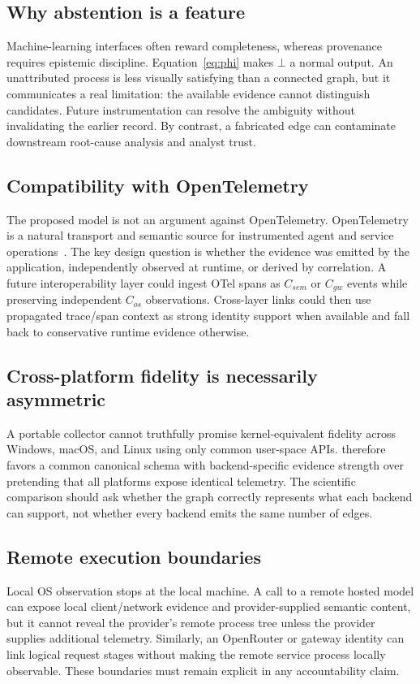 \subsection{Why abstention is a feature}
Machine-learning interfaces often reward completeness, whereas provenance requires epistemic discipline. Equation~\ref{eq:phi} makes $\bot$ a normal output. An unattributed process is less visually satisfying than a connected graph, but it communicates a real limitation: the available evidence cannot distinguish candidates. Future instrumentation can resolve the ambiguity without invalidating the earlier record. By contrast, a fabricated edge can contaminate downstream root-cause analysis and analyst trust.

\subsection{Compatibility with OpenTelemetry}
The proposed model is not an argument against OpenTelemetry. OpenTelemetry is a natural transport and semantic source for instrumented agent and service operations~\cite{otel2026}. The key design question is whether the evidence was emitted by the application, independently observed at runtime, or derived by correlation. A future interoperability layer could ingest OTel spans as $C_{sem}$ or $C_{gw}$ events while preserving independent $C_{os}$ observations. Cross-layer links could then use propagated trace/span context as strong identity support when available and fall back to conservative runtime evidence otherwise.

\subsection{Cross-platform fidelity is necessarily asymmetric}
A portable collector cannot truthfully promise kernel-equivalent fidelity across Windows, macOS, and Linux using only common user-space APIs. \system therefore favors a common canonical schema with backend-specific evidence strength over pretending that all platforms expose identical telemetry. The scientific comparison should ask whether the graph correctly represents what each backend can support, not whether every backend emits the same number of edges.

\subsection{Remote execution boundaries}
Local OS observation stops at the local machine. A call to a remote hosted model can expose local client/network evidence and provider-supplied semantic content, but it cannot reveal the provider's remote process tree unless the provider supplies additional telemetry. Similarly, an OpenRouter or gateway identity can link logical request stages without making the remote service process locally observable. These boundaries must remain explicit in any accountability claim.

